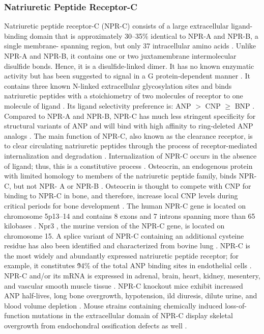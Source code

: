 \documentclass[14pt,a4paper,onecolumn]{article}
\begin{document}
\subsubsection{Natriuretic Peptide Receptor-C}
Natriuretic peptide receptor-C (NPR-C) consists of a large extracellular ligand-binding domain that is approximately 30–35\% identical to NPR-A and NPR-B, a single membrane- spanning region, but only 37 intracellular amino acids \citep{Chang1989} \citep{Fuller1988} \citep{Porter1990}. Unlike NPR-A and NPR-B, it contains one or two juxtamembrane intermolecular disulfide bonds. Hence, it is a disulfide-linked dimer. It has no known enzymatic activity but has been  suggested to signal in a G protein-dependent manner \citep{Rose2008}. It contains three known N-linked extracellular glycosylation sites \citep{Stults1994} and binds natriuretic peptides with a stoichiometry of two molecules of receptor to one molecule of ligand \citep{Ammarguellat2001}. Its ligand selectivity preference is: ANP $>$ CNP $\ge$ BNP \citep{Bennett1991} \citep{Suga1992a}.
Compared to NPR-A and NPR-B, NPR-C has much less stringent specificity for structural variants of ANP and will bind with high affinity to ring-deleted ANP analogs \citep{Maack1987}. The main function of NPR-C, also known as the clearance receptor, is to clear circulating natriuretic peptides through the process of receptor-mediated internalization and degradation \citep{Koh1992} \citep{Nussenzveig1990}. Internalization of NPR-C occurs in the absence of ligand; thus, this is a constitutive process \citep{Nussenzveig1990}. Osteocrin, an endogenous protein with limited homology to members of the natriuretic peptide family, binds NPR-C, but not NPR- A or NPR-B \citep{Moffatt2007}. Osteocrin is thought to compete with CNP for binding to NPR-C in bone, and therefore, increase local CNP levels during critical periods for bone development \citep{Moffatt2007}.
The human NPR-C gene is located on chromosome 5p13–14 and contains 8 exons and 7 introns spanning more than 65  kilobases \citep{Lowe1990} \citep{Rahmutula2002}. Npr3 , the murine version of the NPR-C gene, is located on chromosome 15. A splice variant of NPR-C containing an additional cysteine residue has also been identified and characterized from bovine lung \citep{Mizuno1993}.
NPR-C is the most widely and abundantly expressed natriuretic peptide receptor; for example, it constitutes \~94\% of the total ANP binding sites in endothelial cells \citep{Leitman1986}. NPR-C and/or its mRNA is expressed in adrenal, brain, heart, kidney, mesentery, and vascular smooth muscle tissue \citep{Nagase1997} \citep{Porter1990} \citep{Suga1992c} \citep{Wilcox1991}.
NPR-C knockout mice exhibit increased ANP half-lives, long bone overgrowth, hypotension, ild diuresis, dilute urine, and blood volume depletion  \citep{Matsukawa1999}. Mouse strains containing chemically induced loss-of-function mutations in the extracellular domain of NPR-C display skeletal overgrowth from endochondral ossification defects as well \citep{Jaubert1999}.
\end{document}
